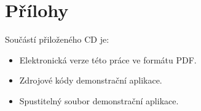 \documentclass[czech,public,dept460,male,cpdeclaration]{diploma}
\begin{document}
\appendix
\section{Přílohy}

Součástí přiloženého CD je:

\begin{itemize}
	\item Elektronická verze této práce ve formátu PDF.
	\item Zdrojové kódy demonstrační aplikace.
	\item Spustitelný soubor demonstrační aplikace.
\end{itemize}
\end{document}
